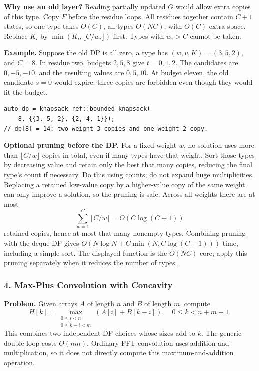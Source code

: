 \textbf{Why use an old layer?} Reading partially updated $G$ would
allow extra copies of this type. Copy $F$ before the residue loops.
All residues together contain $C+1$ states, so one type takes $O(C)$,
all types $O(NC)$, with $O(C)$ extra space.
Replace $K_i$ by $\min(K_i,\lfloor C/w_i\rfloor)$ first.
Types with $w_i>C$ cannot be taken.

\textbf{Example.} Suppose the old DP is all zero, a type has
$(w,v,K)=(3,5,2)$, and $C=8$. In residue two, budgets $2,5,8$ give
$t=0,1,2$. The candidates are $0,-5,-10$, and the resulting values
are $0,5,10$. At budget eleven, the old candidate $s=0$ would expire:
three copies are forbidden even though they would fit the budget.

\begin{minipage}{\linewidth}
\begin{lstlisting}[style=C++,showstringspaces=false]
auto dp = knapsack_ref::bounded_knapsack(
    8, {{3, 5, 2}, {2, 4, 1}});
// dp[8] = 14: two weight-3 copies and one weight-2 copy.
\end{lstlisting}
\end{minipage}
\par

\textbf{Optional pruning before the DP.} For a fixed weight $w$,
no solution uses more than $\lfloor C/w\rfloor$ copies in total,
even if many types have that weight. Sort those types by decreasing
value and retain only the best that many copies, reducing the final
type's count if necessary. Do this using counts; do not expand huge
multiplicities. Replacing a retained low-value copy by a higher-value
copy of the same weight can only improve a solution, so the pruning
is safe. Across all weights there are at most
\[
 \sum_{w=1}^{C}\lfloor C/w\rfloor=O(C\log(C+1))
\]
retained copies, hence at most that many nonempty types. Combining
pruning with the deque DP gives
$O(N\log N+C\min(N,C\log(C+1)))$ time, including a simple sort.
The displayed function is the $O(NC)$ core; apply this pruning
separately when it reduces the number of types.

\subsubsection{4. Max-Plus Convolution with Concavity}
\textbf{Problem.} Given arrays $A$ of length $n$ and $B$ of length
$m$, compute
\[
 H[k]=\max_{\substack{0\le i<n\\0\le k-i<m}}
           (A[i]+B[k-i]),\quad 0\le k<n+m-1.
\]
This combines two independent DP choices whose sizes add to $k$.
The generic double loop costs $O(nm)$. Ordinary FFT convolution uses
addition and multiplication, so it does not directly compute this
maximum-and-addition operation.

